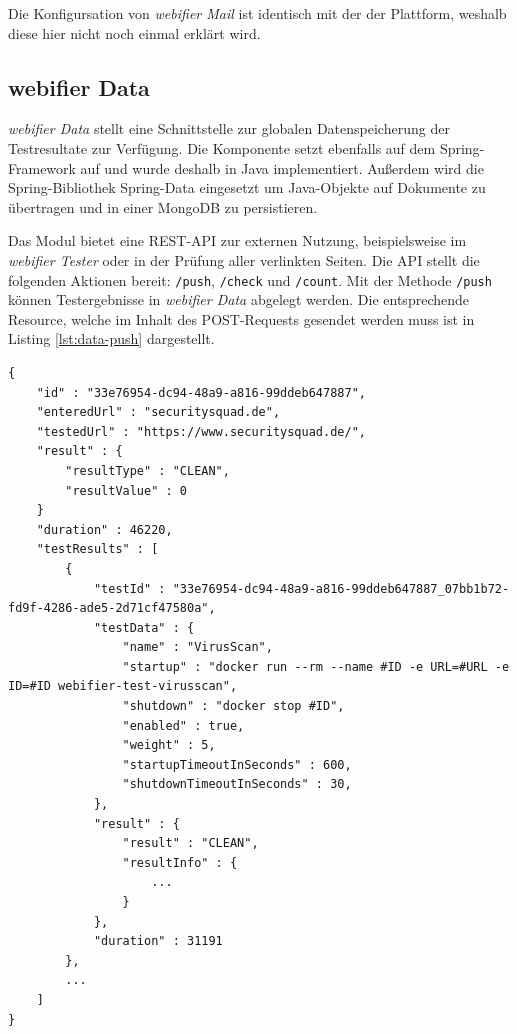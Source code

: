 Die Konfigursation von \textit{webifier Mail} ist identisch mit der der Plattform, weshalb diese hier nicht noch einmal erklärt wird.

\subsection{webifier Data}
\label{sec:umsetzung-data}

\textit{webifier Data} stellt eine Schnittstelle zur globalen Datenspeicherung der Testresultate zur
Verfügung. Die Komponente setzt ebenfalls auf dem Spring-Framework auf und wurde deshalb in Java implementiert. Außerdem wird die Spring-Bibliothek Spring-Data eingesetzt um Java-Objekte auf Dokumente zu übertragen und in einer MongoDB zu persistieren.

Das Modul bietet eine \ac{REST}-\ac{API} zur externen Nutzung, beispielsweise im \textit{webifier
Tester} oder in der Prüfung aller verlinkten Seiten. Die API stellt die folgenden Aktionen bereit:
\lstinline[style=eclipse]{/push}, \lstinline[style=eclipse]{/check} und
\lstinline[style=eclipse]{/count}. Mit der Methode \lstinline[style=eclipse]{/push} können
Testergebnisse in \textit{webifier Data} abgelegt werden. Die entsprechende Resource, welche im Inhalt des POST-Requests gesendet werden muss ist in Listing \ref{lst:data-push} dargestellt.

\begin{scriptsize}
\begin{lstlisting}
{
    "id" : "33e76954-dc94-48a9-a816-99ddeb647887",
    "enteredUrl" : "securitysquad.de",
    "testedUrl" : "https://www.securitysquad.de/",
    "result" : {
        "resultType" : "CLEAN",
        "resultValue" : 0
    }
    "duration" : 46220,
    "testResults" : [
        {
            "testId" : "33e76954-dc94-48a9-a816-99ddeb647887_07bb1b72-fd9f-4286-ade5-2d71cf47580a",
            "testData" : {
                "name" : "VirusScan",
                "startup" : "docker run --rm --name #ID -e URL=#URL -e ID=#ID webifier-test-virusscan",
                "shutdown" : "docker stop #ID",
                "enabled" : true,
                "weight" : 5,
                "startupTimeoutInSeconds" : 600,
                "shutdownTimeoutInSeconds" : 30,
            },
            "result" : {
                "result" : "CLEAN",
                "resultInfo" : {
                    ...
                }
            },
            "duration" : 31191
        },
        ...
    ]
}
\end{lstlisting}
\end{scriptsize}

